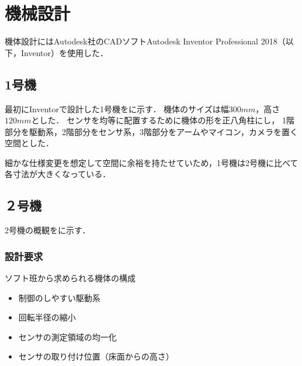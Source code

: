 \documentclass[11pt,a4]{jsarticle}
\begin{document}
\section{機械設計}  %

  機体設計にはAutodesk社のCADソフトAutodesk Inventor Professional 2018（以下，Inventor）を使用した．

  \subsection{1号機}
    最初にInventorで設計した1号機をに示す．
    機体のサイズは幅$300\unit{mm}$，高さ$120\unit{mm}$とした．
    センサを均等に配置するために機体の形を正八角柱にし，
    1階部分を駆動系，2階部分をセンサ系，3階部分をアームやマイコン，カメラを置く空間とした．

    細かな仕様変更を想定して空間に余裕を持たせていため，1号機は2号機に比べて各寸法が大きくなっている．


  \subsection{２号機}
    2号機の概観をに示す．

    \subsubsection{設計要求}
      ソフト班から求められる機体の構成
      \begin{itemize}
       \item 制御のしやすい駆動系
       \item 回転半径の縮小
       \item センサの測定領域の均一化
       \item センサの取り付け位置（床面からの高さ）
      \end{itemize}
\end{document}
